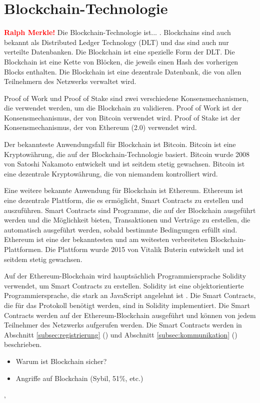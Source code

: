 \section{Blockchain-Technologie}
\textbf{\textcolor{red}{Ralph Merkle!}}
Die Blockchain-Technologie ist... . Blockchains sind auch bekannt als Distributed Ledger 
Technology (DLT) und das sind auch nur verteilte Datenbanken. Die Blockchain ist eine
spezielle Form der DLT. Die Blockchain ist eine Kette von Blöcken, die jeweils einen
Hash des vorherigen Blocks enthalten. Die Blockchain ist eine dezentrale Datenbank, die
von allen Teilnehmern des Netzwerks verwaltet wird.

Proof of Work und Proof of Stake sind zwei verschiedene Konsensmechanismen, die verwendet
werden, um die Blockchain zu validieren. Proof of Work ist der Konsensmechanismus, der
von Bitcoin verwendet wird. Proof of Stake ist der Konsensmechanismus, der von Ethereum (2.0)
verwendet wird.

Der bekannteste Anwendungsfall für Blockchain ist Bitcoin. Bitcoin ist eine Kryptowährung,
die auf der Blockchain-Technologie basiert. Bitcoin wurde 2008 von Satoshi Nakamoto entwickelt
und ist seitdem stetig gewachsen. Bitcoin ist eine dezentrale Kryptowährung, die von niemandem
kontrolliert wird.

Eine weitere bekannte Anwendung für Blockchain ist Ethereum. Ethereum ist eine dezentrale
Plattform, die es ermöglicht, Smart Contracts zu erstellen und auszuführen. Smart Contracts
sind Programme, die auf der Blockchain ausgeführt werden und die Möglichkeit bieten, Transaktionen und
Verträge zu erstellen, die automatisch ausgeführt werden, sobald bestimmte Bedingungen erfüllt sind.
Ethereum ist eine der bekanntesten und am weitesten verbreiteten Blockchain-Plattformen. Die Plattform
wurde 2015 von Vitalik Buterin entwickelt und ist seitdem stetig gewachsen.


Auf der Ethereum-Blockchain wird hauptsächlich Programmiersprache Solidity verwendet, um Smart Contracts zu erstellen. Solidity ist eine objektorientierte Programmiersprache, die stark an JavaScript angelehnt ist \parencite[S. 131]{Antonopoulos_MasteringEthereum}. Die Smart Contracts, die für das Protokoll benötigt werden, sind in Solidity implementiert. Die Smart Contracts werden auf der Ethereum-Blockchain ausgeführt und können von jedem Teilnehmer des Netzwerks aufgerufen werden. Die Smart Contracts werden in Abschnitt \ref{subsec:registrierung} () und Abschnitt \ref{subsec:kommunikation} () beschrieben.

\begin{itemize}
    \item Warum ist Blockchain sicher?
    \item Angriffe auf Blockchain (Sybil, 51\%, etc.)
\end{itemize}


‚